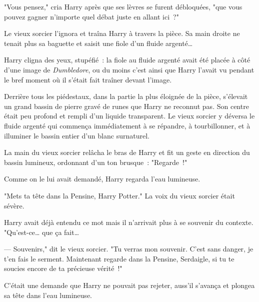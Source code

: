 "Vous pensez," cria Harry après que ses lèvres se furent débloquées, "que vous pouvez gagner n'importe quel débat juste en allant ici~?"

Le vieux sorcier l'ignora et traîna Harry à travers la pièce. Sa main droite ne tenait plus sa baguette et saisit une fiole d'un fluide argenté…

Harry cligna des yeux, stupéfié~: la fiole au fluide argenté avait été placée à côté d'une image de \emph{Dumbledore}, ou du moins c'est ainsi que Harry l'avait vu pendant le bref moment où il s'était fait traîner devant l'image.

Derrière tous les piédestaux, dans la partie la plus éloignée de la pièce, s'élevait un grand bassin de pierre gravé de runes que Harry ne reconnut pas. Son centre était peu profond et rempli d'un liquide transparent. Le vieux sorcier y déversa le fluide argenté qui commença immédiatement à se répandre, à tourbillonner, et à illuminer le bassin entier d'un blanc surnaturel.

La main du vieux sorcier relâcha le bras de Harry et fit un geste en direction du bassin lumineux, ordonnant d'un ton brusque~: "Regarde~!"

Comme on le lui avait demandé, Harry regarda l'eau lumineuse.

"Mets ta tête dans la Pensine, Harry Potter." La voix du vieux sorcier était sévère.

Harry avait déjà entendu ce mot mais il n'arrivait plus à se souvenir du contexte. "Qu'est-ce… que ça fait…

--- Souvenirs," dit le vieux sorcier. "Tu verras mon souvenir. C'est sans danger, je t'en fais le serment. Maintenant regarde dans la Pensine, Serdaigle, si tu te soucies encore de ta précieuse vérité~!"

C'était une demande que Harry ne pouvait pas rejeter, auss'il s'avança et plongea sa tête dans l'eau lumineuse.
\later


